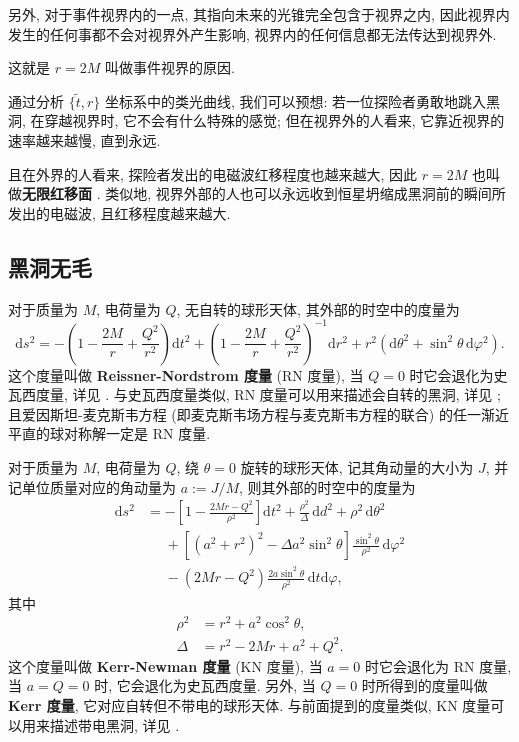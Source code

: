另外, 对于事件视界内的一点, 其指向未来的光锥完全包含于视界之内, 因此视界内发生的任何事都不会对视界外产生影响, 视界内的任何信息都无法传达到视界外.

\begin{remark}
	这就是 $r=2M$ 叫做事件视界的原因.
\end{remark}

通过分析 $\{\tilde{t},r\}$ 坐标系中的类光曲线, 我们可以预想: 若一位探险者勇敢地跳入黑洞, 在穿越视界时, 它不会有什么特殊的感觉; 但在视界外的人看来, 它靠近视界的速率越来越慢, 直到永远.

\begin{remark}
	且在外界的人看来, 探险者发出的电磁波红移程度也越来越大, 因此 $r=2M$ 也叫做{\bf 无限红移面} \cite[\S\,9.4.4]{梁灿彬2000微分几何入门与广义相对论}. 类似地, 视界外部的人也可以永远收到恒星坍缩成黑洞前的瞬间所发出的电磁波, 且红移程度越来越大.
\end{remark}

\subsection{黑洞无毛}
对于质量为 $M$, 电荷量为 $Q$, 无自转的球形天体, 其外部的时空中的度量为
\[ \mathrm{d}s^2=-\left( 1-\frac{2M}{r}+\frac{Q^2}{r^2} \right)\mathrm{d}t^2+\left( 1-\frac{2M}{r}+\frac{Q^2}{r^2} \right)^{-1}\mathrm{d}r^2+r^2(\mathrm{d}\theta^2+\sin^2\theta\,\mathrm{d}\varphi^2). \] 
这个度量叫做 {\bf Reissner-Nordstrom 度量} (RN 度量), 当 $Q=0$ 时它会退化为史瓦西度量, 详见 \cite[\S\,8.4]{梁灿彬2000微分几何入门与广义相对论}. 与史瓦西度量类似, RN 度量可以用来描述会自转的黑洞, 详见 \cite[\S\,13.1]{梁灿彬2000微分几何入门与广义相对论}; 且爱因斯坦-麦克斯韦方程 (即麦克斯韦场方程与麦克斯韦方程的联合) 的任一渐近平直的球对称解一定是 RN 度量.

对于质量为 $M$, 电荷量为 $Q$, 绕 $\theta=0$ 旋转的球形天体, 记其角动量的大小为 $J$, 并记单位质量对应的角动量为 $a:=J/M$, 则其外部的时空中的度量为
\begin{align*}
	\mathrm{d}s^2 &=-\left[ 1-\frac{2Mr-Q^2}{\rho^2} \right]\mathrm{d}t^2+\frac{\rho^2}{\Delta}\,\mathrm{d}d^2+\rho^2\,\mathrm{d}\theta^2\\
	&\phantom{{}={}}+\left[ (a^2+r^2)^2-\Delta a^2\sin^2\theta \right]\frac{\sin^2\theta}{\rho^2}\,\mathrm{d}\varphi^2\\
	&\phantom{{}={}}-(2Mr-Q^2)\frac{2a\sin^2\theta}{\rho^2}\,\mathrm{d}t\mathrm{d}\varphi,
\end{align*} 
其中 
\begin{align*}
	\rho^2&=r^2+a^2\cos^2\theta,\\
	\Delta&=r^2-2Mr+a^2+Q^2.
\end{align*}
这个度量叫做 {\bf Kerr-Newman 度量} (KN 度量), 当 $a=0$ 时它会退化为 RN 度量, 当 $a=Q=0$ 时, 它会退化为史瓦西度量. 另外, 当 $Q=0$ 时所得到的度量叫做 {\bf Kerr 度量}, 它对应自转但不带电的球形天体. 与前面提到的度量类似, KN 度量可以用来描述带电黑洞, 详见 \cite[第 13 章]{梁灿彬2000微分几何入门与广义相对论}.

